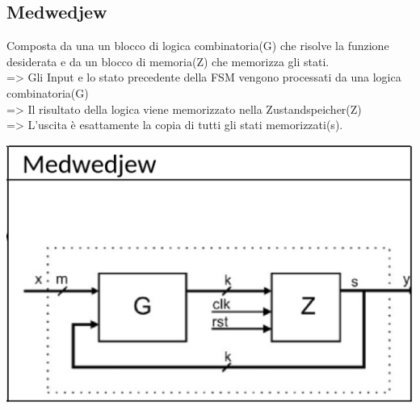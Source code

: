     \subsection{Medwedjew}
    \begin{minipage}[t]{0.48\columnwidth}
        \vspace{0pt} %
        Composta da una un blocco di logica combinatoria(G) che risolve la funzione desiderata e da un blocco di memoria(Z)
        che memorizza gli stati.\\ 
        => Gli Input e lo stato precedente della FSM vengono processati da una logica combinatoria(G)\\
        => Il risultato della logica viene memorizzato nella Zustandspeicher(Z)\\
        => L'uscita è esattamente la copia di tutti gli stati memorizzati(s).
    \end{minipage}%
    \hfill
    \begin{minipage}[t]{0.48\columnwidth}
        \vspace{0pt} %
        \includegraphics[width=\linewidth]{Images/Medwedjew.png}
    \end{minipage}

